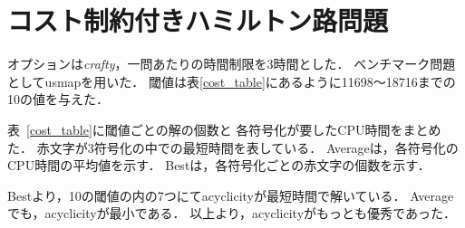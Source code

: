 \section{コスト制約付きハミルトン路問題}


オプションは\textit{crafty}，一問あたりの時間制限を3時間とした．
ベンチマーク問題として\textsf{usmap}を用いた．
閾値は表\ref{cost_table}にあるように11698〜18716までの10の値を与えた．

表~\ref{cost_table}に閾値ごとの解の個数と
各符号化が要したCPU時間をまとめた．
赤文字が3符号化の中での最短時間を表している．
Averageは，各符号化のCPU時間の平均値を示す．
Bestは，各符号化ごとの赤文字の個数を示す．

Bestより，10の閾値の内の7つにて\textsf{acyclicity}が最短時間で解いている．
Averageでも，\textsf{acyclicity}が最小である．
以上より，\textsf{acyclicity}がもっとも優秀であった．

